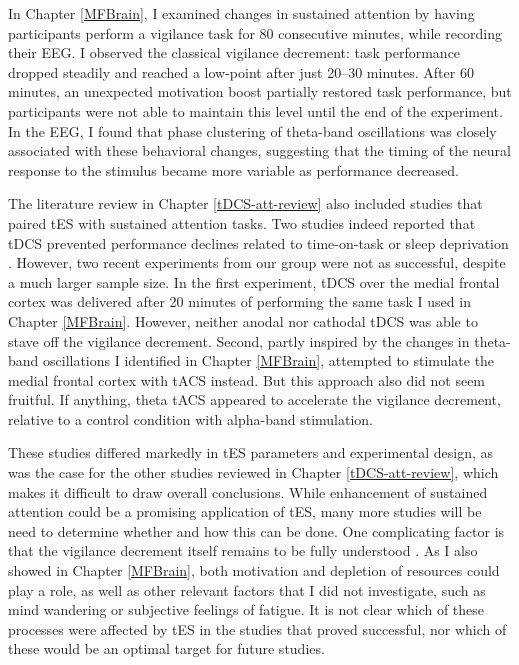 \documentclass[11pt,english,]{memoir}
\begin{document}
In Chapter \ref{MFBrain}, I examined changes in sustained attention by having participants perform a vigilance task for 80 consecutive minutes, while recording their EEG. I observed the classical vigilance decrement: task performance dropped steadily and reached a low-point after just 20--30 minutes. After 60 minutes, an unexpected motivation boost partially restored task performance, but participants were not able to maintain this level until the end of the experiment. In the EEG, I found that phase clustering of theta-band oscillations was closely associated with these behavioral changes, suggesting that the timing of the neural response to the stimulus became more variable as performance decreased.

The literature review in Chapter \ref{tDCS-att-review} also included studies that paired tES with sustained attention tasks. Two studies indeed reported that tDCS prevented performance declines related to time-on-task \autocite{Nelson2014} or sleep deprivation \autocite{McIntire2014}. However, two recent experiments from our group \autocite{VanSchouwenburg2019} were not as successful, despite a much larger sample size. In the first experiment, tDCS over the medial frontal cortex was delivered after 20 minutes of performing the same task I used in Chapter \ref{MFBrain}. However, neither anodal nor cathodal tDCS was able to stave off the vigilance decrement. Second, partly inspired by the changes in theta-band oscillations I identified in Chapter \ref{MFBrain}, \textcite{VanSchouwenburg2019} attempted to stimulate the medial frontal cortex with tACS instead. But this approach also did not seem fruitful. If anything, theta tACS appeared to accelerate the vigilance decrement, relative to a control condition with alpha-band stimulation.

These studies differed markedly in tES parameters and experimental design, as was the case for the other studies reviewed in Chapter \ref{tDCS-att-review}, which makes it difficult to draw overall conclusions. While enhancement of sustained attention could be a promising application of tES, many more studies will be need to determine whether and how this can be done. One complicating factor is that the vigilance decrement itself remains to be fully understood \autocites{Fortenbaugh2017}{Hancock2013}{Johnston2018}. As I also showed in Chapter \ref{MFBrain}, both motivation and depletion of resources could play a role, as well as other relevant factors that I did not investigate, such as mind wandering or subjective feelings of fatigue. It is not clear which of these processes were affected by tES in the studies that proved successful, nor which of these would be an optimal target for future studies.
\end{document}
